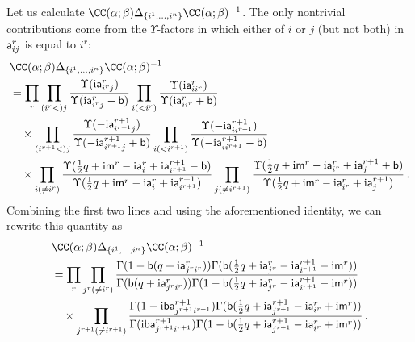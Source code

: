 Let us calculate
$\CC(\alpha; \beta) \Delta_{\{i^1,\dotsc,i^n\}} \CC(\alpha;
\beta)^{-1}$.  The only nontrivial contributions come from the
$\Upsilon$-factors in which either of $i$ or $j$ (but not both) in
$\mathsf{a}^r_{ij}$ is equal to $i^r$:
\begin{equation}
  \begin{split}
    & \CC(\alpha; \beta) \Delta_{\{i^1,\dotsc,i^n\}} \CC(\alpha; \beta)^{-1}
    \\
    &=
    \prod_r
    \prod_{(i^r<)j}
    \frac{\Upsilon(\iu \as^r_{i^r j})}{\Upsilon(\iu \as^r_{i^r j} - \bs)}
    \prod_{i(<i^r)}
    \frac{\Upsilon(\iu \as^r_{ii^r})}{\Upsilon(\iu \as^r_{ii^r} + \bs)}
    \\ & \quad
    \times
    \prod_{(i^{r+1}<)j}
    \frac{\Upsilon(-\iu \as^{r+1}_{i^{r+1} j})}
         {\Upsilon(-\iu \as^{r+1}_{i^{r+1} j} + \bs)}
    \prod_{i(<i^{r+1})}
    \frac{\Upsilon(-\iu \as^{r+1}_{ii^{r+1}})}
         {\Upsilon(-\iu \as^{r+1}_{ii^{r+1}} - \bs)}
    \\ & \quad
    \times
    \prod_{i(\neq i^r)}
    \frac{\Upsilon(\frac12 q + \iu \ms^r - \iu \as^r_{i} + \iu \as^{r+1}_{i^{r+1}} - \bs)}
         {\Upsilon(\frac12 q + \iu \ms^r - \iu \as^r_{i} + \iu \as^{r+1}_{i^{r+1}})}
    \prod_{j(\neq i^{r+1})}
    \frac{\Upsilon(\frac12 q + \iu \ms^r - \iu \as^r_{i^r} + \iu \as^{r+1}_{j} + \bs)}
         {\Upsilon(\frac12 q + \iu \ms^r - \iu \as^r_{i^r} + \iu \as^{r+1}_{j})}
 \,.
  \end{split}
\end{equation}
Combining the first two lines and using the aforementioned identity,
we can rewrite this quantity as
\begin{equation}
  \begin{split}
    &\CC(\alpha; \beta) \Delta_{\{i^1,\dotsc,i^n\}} \CC(\alpha; \beta)^{-1}
    \\
    &=
    \prod_r
    \prod_{j^r (\neq i^r)}
    \frac{\Gamma(1 - \bs(q + \iu \as^r_{j^r i^r}))
        \Gamma(\bs(\frac12 q + \iu \as^r_{j^r} - \iu \as^{r+1}_{i^{r+1}} - \iu \ms^r))}
      {\Gamma(\bs(q + \iu \as^r_{j^r i^r}))
       \Gamma(1 - \bs(\frac12 q + \iu \as^r_{j^r} - \iu \as^{r+1}_{i^{r+1}} - \iu \ms^r))}
    \\
    & \quad
    \times
    \prod_{j^{r+1}(\neq i^{r+1})}
    \frac{\Gamma(1 - \iu\bs \as^{r+1}_{j^{r+1} i^{r+1}})
      \Gamma(\bs(\frac12 q + \iu \as^{r+1}_{j^{r+1}} - \iu \as^r_{i^r} + \iu \ms^r))}
    {\Gamma(\iu\bs\as^{r+1}_{j^{r+1} i^{r+1}})
     \Gamma(1 - \bs(\frac12 q + \iu \as^{r+1}_{j^{r+1}} - \iu \as^r_{i^r} + \iu \ms^r))}
    \,.
  \end{split}
\end{equation}

